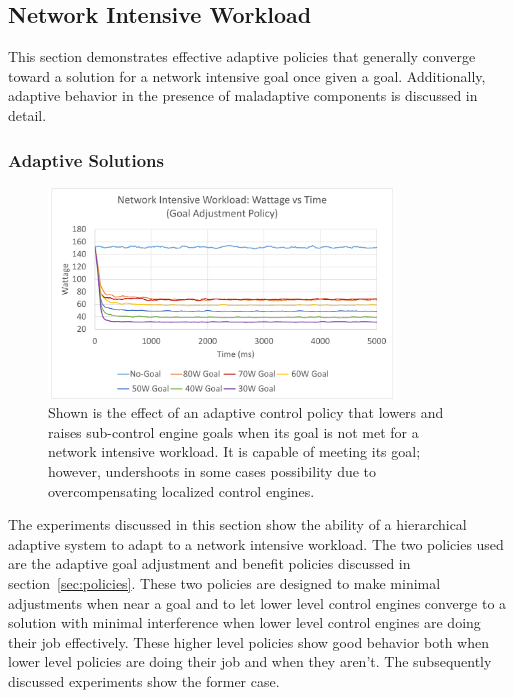     \subsection{Network Intensive Workload}
        This section demonstrates effective adaptive policies that generally converge toward a solution for a network intensive goal once given a goal. Additionally, adaptive behavior in the presence of maladaptive components is discussed in detail.

        \subsubsection{Adaptive Solutions}
            \begin{figure}[htb!]
                \centering
                \includegraphics[width=0.82\textwidth]{Fig/network_goal_adjustment.pdf}
                \caption[Network Intensive Workload Using an Adaptive Goal Adjustment Policy (Watts vs Time)]{Shown is the effect of an adaptive control policy that lowers and raises sub-control engine goals when its goal is not met for a network intensive workload. It is capable of meeting its goal; however, undershoots in some cases possibility due to overcompensating localized control engines.}
                \label{fig:network_goal_adjustment}
            \end{figure}
    
            The experiments discussed in this section show the ability of a hierarchical adaptive system to adapt to a network intensive workload. The two policies used are the adaptive goal adjustment and benefit policies discussed in section~\ref{sec:policies}. These two policies are designed to make minimal adjustments when near a goal and to let lower level control engines converge to a solution with minimal interference when lower level control engines are doing their job effectively. These higher level policies show good behavior both when lower level policies are doing their job and when they aren't. The subsequently discussed experiments show the former case.

